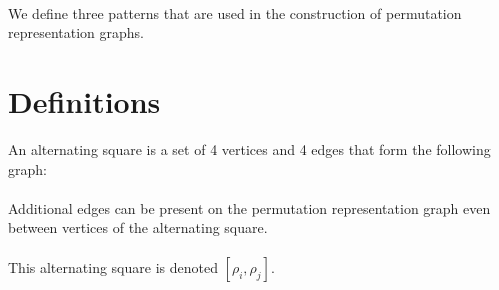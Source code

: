 \paragraph{}
We define three patterns that are used in the construction of permutation representation graphs.

\section{Definitions}
\begin{definition}
  An alternating square is a set of 4 vertices and 4 edges that form the following graph:

  \begin{figure}[H]
    \begin{center}
      \caption{}
    \end{center}
  \end{figure}

  \paragraph{}
  Additional edges can be present on the permutation representation graph even between vertices of the alternating square.

  \paragraph{}
  This alternating square is denoted $[\rho_i, \rho_j]$.
\end{definition}

